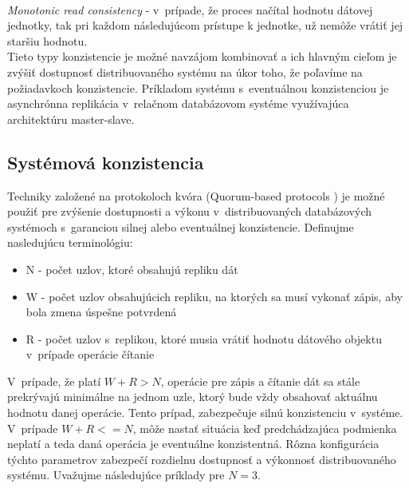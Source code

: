 \documentclass[11pt,twoside,a4paper]{book}
\begin{document}
\noindent 
\\
\emph{Monotonic read consistency} - v~prípade, že proces načítal hodnotu dátovej jednotky, tak pri každom následujúcom prístupe k jednotke, už nemôže vrátiť jej staršiu hodnotu. \\



Tieto typy konzistencie je možné navzájom kombinovať a ich hlavným cieľom je zvýšiť dostupnosť distribuovaného systému na úkor toho, že poľavíme na požiadavkoch konzistencie. Príkladom systému s~eventuálnou konzistenciou je asynchrónna replikácia v~relačnom databázovom systéme využívajúca architektúru master-slave.

\subsection{Systémová konzistencia}
\label{section:Consistency}
Techniky založené na protokoloch kvóra (Quorum-based protocols \cite{gifford1979weighted}) je možné použiť pre zvýšenie dostupnosti a výkonu v~distribuovaných databázových systémoch s~garanciou silnej alebo eventuálnej konzistencie. Definujme nasledujúcu terminológiu:
\begin{itemize}
 \item N - počet uzlov, ktoré obsahujú repliku dát
 \item W - počet uzlov obsahujúcich repliku, na ktorých sa musí vykonať zápis, aby bola zmena úspešne potvrdená
 \item R - počet uzlov s~replikou, ktoré musia vrátiť hodnotu dátového objektu v~prípade operácie čítanie
\end{itemize}

V~prípade, že platí $W + R > N$, operácie pre zápis a čítanie dát sa stále prekrývajú minimálne na jednom uzle, ktorý bude vždy obsahovať aktuálnu hodnotu danej operácie. Tento prípad, zabezpečuje silnú konzistenciu v~systéme. V~prípade $W + R <= N$, môže nastať situácia keď predchádzajúca podmienka neplatí a teda daná operácia je eventuálne konzistentná. Rôzna konfigurácia týchto parametrov zabezpečí rozdielnu dostupnosť a výkonnosť distribuovaného systému.  Uvažujme následujúce príklady pre $N = 3$.
\end{document}
